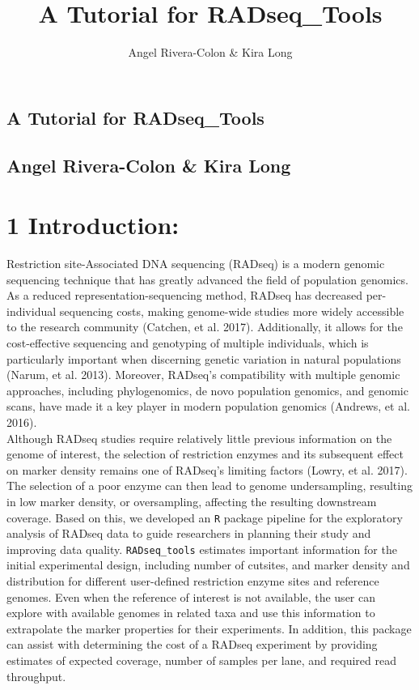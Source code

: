 \documentclass{article}
\title{A Tutorial for RADseq_Tools}
\author{Angel Rivera-Colon & Kira Long}
\begin{document}



\begin{center}
\section*{\huge A Tutorial for RADseq\_Tools}
\subsection*{\Large Angel Rivera-Colon \& Kira Long}
\end{center}


\section*{1 Introduction:}

Restriction site-Associated DNA sequencing (RADseq) is a modern genomic sequencing technique that has greatly advanced the field of population genomics. As a reduced representation-sequencing method, RADseq has decreased per-individual sequencing costs, making genome-wide studies more widely accessible to the research community (Catchen, et al. 2017). Additionally, it allows for the cost-effective sequencing and genotyping of multiple individuals, which is particularly important when discerning genetic variation in natural populations (Narum, et al. 2013). Moreover, RADseq’s compatibility with multiple genomic approaches, including phylogenomics, de novo population genomics, and genomic scans, have made it a key player in modern population genomics (Andrews, et al. 2016).\\
Although RADseq studies require relatively little previous information on the genome of interest, the selection of restriction enzymes and its subsequent effect on marker density remains one of RADseq’s limiting factors (Lowry, et al. 2017). The selection of a poor enzyme can then lead to genome undersampling, resulting in low marker density, or oversampling, affecting the resulting downstream coverage. Based on this, we developed an \texttt{R} package pipeline for the exploratory analysis of RADseq data to guide researchers in planning their study and improving data quality. \texttt{RADseq\_tools} estimates important information for the initial experimental design, including number of cutsites, and marker density and distribution for different user-defined restriction enzyme sites and reference genomes. Even when the reference of interest is not available, the user can explore with available genomes in related taxa and use this information to extrapolate the marker properties for their experiments. In addition, this package can assist with determining the cost of a RADseq experiment by providing estimates of expected coverage, number of samples per lane, and required read throughput. 
\end{document}
